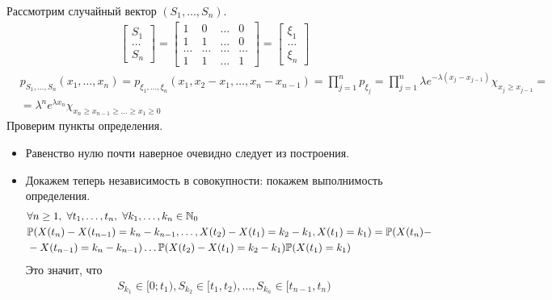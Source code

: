 \begin{Proof}
    Рассмотрим случайный вектор $(S_1, \dots, S_n)$.
    \begin{align*}
      & \left[ \begin{matrix}
              S_1 \\
              \dots \\
              S_n
          \end{matrix} \right] =\left[ \begin{matrix}
              1 & 0 & \dots & 0 \\
              1 & 1 & \dots & 0 \\
              \dots & \dots & \dots & \dots \\
              1 & 1 & \dots & 1
          \end{matrix} \right] = \left[ \begin{matrix}
              \xi_1 \\
              \dots \\
              \xi_n
          \end{matrix} \right]
    \end{align*}
    \begin{align*}
      & p_{S_1, \dots, S_n}(x_1, \dots, x_n) = p_{\xi_1, \dots, \xi_n}(x_1, x_2-x_1, \dots, x_n-x_{n-1}) = \prod_{j=1}^n p_{\xi_j} = \prod_{j=1}^n \lambda e^{-\lambda(x_j-x_{j-1})}\chi_{x_{j}\geq x_{j-1}} = \\
      & = \lambda^n e^{\lambda x_{n}} \chi_{x_n \geq x_{n-1} \geq \dots \geq x_1 \geq 0}
    \end{align*}
    Проверим пункты определения.
    \begin{itemize}
        \item Равенство нулю почти наверное очевидно следует из построения.
        \item Докажем теперь независимость в совокупности: покажем выполнимость
        определения.
        \begin{align*}
          & \forall n \geq 1, \ \forall t_1, \dots, t_n, \ \forall k_1, \dots, k_n \in \mathbb{N}_0 \\
          & \mathbb{P}(X(t_n)-X(t_{n-1}) = k_n-k_{n-1}, \dots, X(t_2) - X(t_1) = k_2-k_1, X(t_1) = k_1) = \mathbb{P}(X(t_n)- \\
          & - X(t_{n-1}) = k_n-k_{n-1})\dots \mathbb{P}(X(t_2) - X(t_1) = k_2-k_1) \mathbb{P}(X(t_1) = k_1)
        \end{align*}
        Это значит, что
        \begin{align*}
          & S_{k_1} \in [0; t_{1}), S_{k_2} \in [t_1, t_2), \dots, S_{k_n} \in [t_{n-1}, t_n)

\end{align*}
\end{itemize}
\end{Proof}
